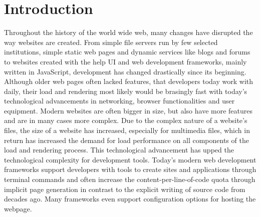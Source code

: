 \documentclass[a4paper, fontsize=11pt]{article}
\begin{document}
\section{Introduction}\label{sec:introduction}
Throughout the history of the world wide web, many changes have disrupted the way websites are created.
From simple file servers run by few selected institutions, simple static web pages and dynamic services like blogs and forums to websites created with the help UI and web development frameworks, mainly written in JavaScript, development has changed drastically since its beginning.
Although older web pages often lacked features, that developers today work with daily, their load and rendering most likely would be brasingly fast with today's technological advancements in networking, browser functionalities and user equipment.
Modern websites are often bigger in size, but also have more features and are in many cases more complex.
Due to the complex nature of a website's files, the size of a website has increased, especially for multimedia files, which in return has increased the demand for load performance on all components of the load and rendering process.
This technological advancement has upped the technological complexity for development tools.
Today's modern web development frameworks support developers with tools to create sites and applications through terminal commands and often increase the content-per-line-of-code quota through implicit page generation in contrast to the explicit writing of source code from decades ago.
Many frameworks even support configuration options for hosting the webpage.
\end{document}
